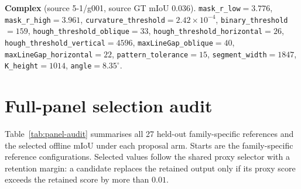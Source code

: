 \documentclass[a4paper,fleqn]{cas-dc}
\begin{document}
{\begin{hlbox}
\medskip
\noindent\textbf{Complex} (source 5-1/g001, source GT mIoU $0.036$).
\texttt{mask\_r\_low}$=3.776$,
\texttt{mask\_r\_high}$=3.961$,
\texttt{curvature\_threshold}$=2.42\times10^{-4}$,
\texttt{binary\_threshold}$=159$,
\texttt{hough\_threshold\_oblique}$=33$,
\texttt{hough\_threshold\_horizontal}$=26$,
\texttt{hough\_threshold\_vertical}$=4596$,
\texttt{maxLineGap\_oblique}$=40$,
\texttt{maxLineGap\_horizontal}$=22$,
\texttt{pattern\_tolerance}$=15$,
\texttt{segment\_width}$=1847$,
\texttt{K\_height}$=1014$,
\texttt{angle}$=8.35^{\circ}$.
\end{hlbox}

\section{Full-panel selection audit}\label{app:poc-selection}

Table~\ref{tab:panel-audit} summarises all 27 held-out family-specific references and the selected offline mIoU under each proposal arm. Starts are the family-specific reference configurations. Selected values follow the shared proxy selector with a retention margin: a candidate replaces the retained output only if its proxy score exceeds the retained score by more than $0.01$.

}
\end{document}

